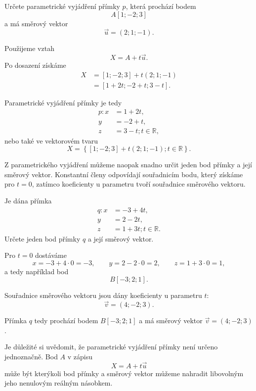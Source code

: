 \begin{example}
    \label{exa:Parametric_line_in_space_point_direction}
    Určete parametrické vyjádření přímky $p$, která prochází bodem
    \[
        A[1;-2;3]
    \]
    a má směrový vektor
    \[
        \vec{u}=(2;1;-1).
    \]

    Použijeme vztah
    \[
        X=A+t\vec{u}.
    \]
    Po dosazení získáme
    \begin{align*}
        X
        &=[1;-2;3]+t(2;1;-1)\\
        &=[1+2t;-2+t;3-t].
    \end{align*}

    Parametrické vyjádření přímky je tedy
    \[
        \begin{aligned}
            p: x&=1+2t,\\
            y&=-2+t,\\
            z&=3-t; t\in\mathbb{R},
        \end{aligned}
    \]
    nebo také ve vektorovém tvaru
    \[
        X=\left\{[1;-2;3]+t(2;1;-1); t\in\mathbb{R}\right\}.
    \]
\end{example}

Z parametrického vyjádření můžeme naopak snadno určit jeden bod přímky
a její směrový vektor. Konstantní členy odpovídají souřadnicím bodu, který
získáme pro $t=0$, zatímco koeficienty u parametru tvoří souřadnice
směrového vektoru.

\begin{example}
    \label{exa:Reading_line_in_space}
    Je dána přímka
    \[
        \begin{aligned}
            q: x&=-3+4t,\\
            y&=2-2t,\\
            z&=1+3t; t\in\mathbb{R}.
        \end{aligned}
    \]
    Určete jeden bod přímky $q$ a její směrový vektor.

    Pro $t=0$ dostáváme
    \[
        x=-3 + 4\cdot 0 = -3,\qquad y=2 - 2\cdot 0 = 2,\qquad z=1 + 3\cdot 0 = 1,
    \]
    a tedy například bod
    \[
        B[-3;2;1].
    \]

    Souřadnice směrového vektoru jsou dány koeficienty u parametru $t$:
    \[
        \vec{v}=(4;-2;3).
    \]

    Přímka $q$ tedy prochází bodem $B[-3;2;1]$ a má směrový vektor
    $\vec{v}=(4;-2;3)$.
\end{example}

Je důležité si uvědomit, že parametrické vyjádření přímky není určeno
jednoznačně. Bod $A$ v zápisu
\[
    X=A+t\vec{u}
\]
může být kterýkoli bod přímky a směrový vektor můžeme nahradit libovolným
jeho nenulovým reálným násobkem.

